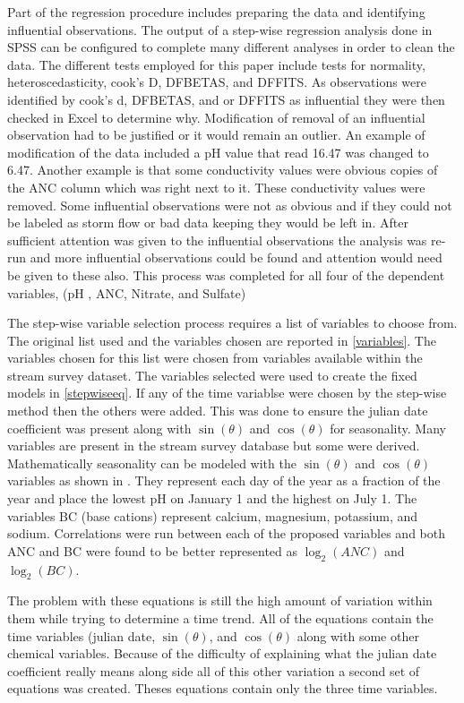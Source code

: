  Part of the regression procedure includes preparing the data and  identifying influential observations.  The output of a step-wise regression analysis done in SPSS can be configured to complete many different analyses in order to clean the data.  The different tests employed for this paper include tests for normality, heteroscedasticity, cook's D, DFBETAS, and DFFITS.  As observations were identified by cook's d, DFBETAS, and or DFFITS as influential they were then checked in Excel to determine why.  Modification of removal of an influential observation had to be justified or it would remain an outlier.  An example of modification of the data included a pH value that read 16.47 was changed to 6.47.  Another example is that some conductivity values were obvious copies of the ANC column which was right next to it.  These conductivity values were removed.   Some influential observations were not as obvious and if they could not be labeled as storm flow or bad data keeping they would be left in.  After sufficient attention was given to the influential observations the analysis was re-run and more influential observations could be found and attention would need be given to these also.  This process was completed for all four of the dependent variables, (pH , ANC, Nitrate, and Sulfate)
 
 The step-wise variable selection process requires a list of variables to choose from.  The original list used and the variables chosen are reported in \autoref{variables}.  The variables chosen for this list were chosen from variables available within the stream survey dataset.   The variables selected were used to create the fixed models in \autoref{stepwiseeq}.  If any of the time variablse were chosen by the step-wise method then the others were added.  This was done to ensure the julian date coefficient was present along with $\sin(\theta)$ and $\cos(\theta)$ for seasonality.  Many variables are present in the stream survey database but some were derived.  Mathematically seasonality can be modeled with the $\sin(\theta)$ and $\cos(\theta)$ variables as shown in \citet{helsel1992statistical}.  They represent each day of the year as a fraction of the year and place the lowest pH on January 1 and the highest on July 1.  The variables BC (base cations) represent calcium, magnesium, potassium, and sodium.  Correlations were run between each of the proposed variables  and both ANC and BC were found to be better represented as $\log_2(ANC)$ and $\log_2(BC)$.
 

 The problem with these equations is still the high amount of variation within them while trying to determine a time trend.  All of the equations contain the time variables (julian date, $\sin(\theta)$, and $\cos(\theta)$ along with some other chemical variables.  Because of the difficulty of explaining what the julian date coefficient really means along side all of this other variation a second set of equations was created.  Theses equations contain only the three time variables.
 
